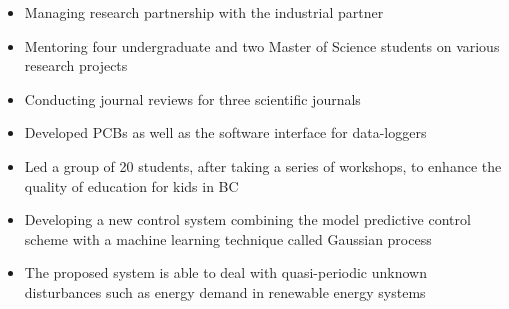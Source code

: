 \documentclass[10pt,letterpaper,ragged2e,compact]{mocv}
\begin{document}
\begin{paracol}{2}
    \begin{itemize}
        \item Managing research partnership with the industrial partner %
        \item Mentoring four undergraduate and two Master of Science students on various research projects
        \item Conducting journal reviews for three scientific journals
    \end{itemize}
    \divider
    \begin{itemize}
        \item Developed PCBs as well as the software interface for data-loggers
    \end{itemize}
    \divider
    \begin{itemize}
        \item Led a group of 20 students, after taking a series of workshops, to enhance the quality of education for kids in BC
    \end{itemize}
    \begin{itemize}
        \item Developing a new control system combining the model predictive control scheme with a machine learning technique called Gaussian process
        \item The proposed system is able to deal with quasi-periodic unknown disturbances such as energy demand in renewable energy systems
    \end{itemize}
    \divider

\end{paracol}
\end{document}
